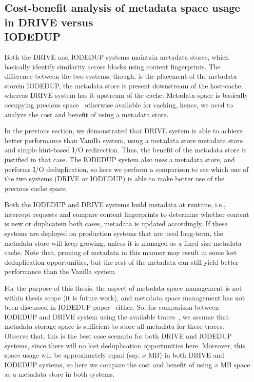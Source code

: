 %

\subsection{Cost-benefit analysis of metadata space usage in DRIVE versus \\IODEDUP}
Both the DRIVE and IODEDUP systems maintain metadata stores, which 
basically identify similarity across blocks using content fingerprints.
The difference between the two systems, though, is the placement of
the metadata store\textemdash{}in IODEDUP, the metadata store is present downstream
of the host-cache, whereas DRIVE system has it upstream of the cache.
Metadata space is basically occupying precious space~\cite{idedup} otherwise 
available for caching, hence, we need to analyze the cost
and benefit of using a metadata store. 

In the previous section, we demonstrated that DRIVE system is able
to achieve better performance than Vanilla system, using a metadata store
metadata store and simple hint-based I/O redirection. Thus, the benefit
of the metadata store is justified in that case.
The IODEDUP system also uses a metadata store, and performs I/O
deduplication, so here we perform a comparison to see which one
of the two systems (DRIVE or IODEDUP) is able to make better use
of the precious cache space. 

Both the IODEDUP and DRIVE systems build metadata at runtime, i.e.,
intercept requests and compare content fingerprints to determine
whether content is new or duplicate\textemdash{}in both cases, metadata 
is updated accordingly. If these systems are deployed on 
production systems that are used long-term, the metadata store
will keep growing, unless it is managed as a fixed-size metadata cache.
Note that, pruning of metadata in this manner may result in some
lost deduplication opportunities, but the rest of the metadata
can still yield better performance than the Vanilla system.

For the purpose of this thesis, the aspect of metadata space 
management is not within thesis scope (it is future work), and
metadata space management has not been discussed in 
IODEDUP paper~\cite{iodedup} either.
So, for comparison between IODEDUP and DRIVE system using the 
available traces~\cite{iodedup-online}, we assume
that metadata storage space is sufficient to store all metadata
for these traces.
Observe that, this is
the best case scenario for both DRIVE and IODEDUP systems,
since there will no lost deduplication opportunities here.
Moreover, this space usage will be approximately equal (say, $x$ MB)
in both DRIVE and IODEDUP systems, so here we compare the cost and 
benefit of using $x$ MB space as a metadata store in both systems.

